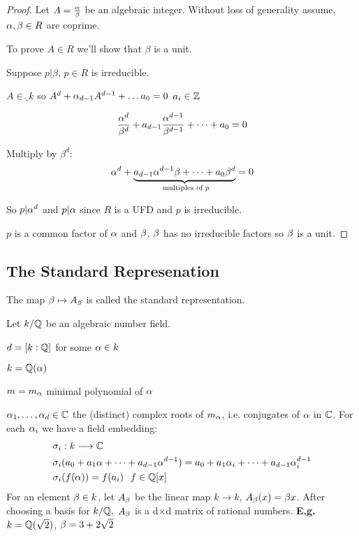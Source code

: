 \documentclass[11pt]{article}
\begin{document}
\begin{proof}
	Let $A = \frac{\alpha}{\beta}$ be an algebraic integer. 
	Without loss of generality assume, $\alpha, \beta \in R$ are coprime.

	To prove $A \in R$ we'll show that $\beta $ is a unit.

	Suppose $p | \beta $, $p \in R$ is irreducible.
 	\spa

	$A \in \ring_k$ so $A^d + \alpha_{d-1}A^{d-1} + \dots a_0 = 0$ \hspace{7pt} $a_i \in \mathbb{Z}$


	\begin{align*}
		\frac{\alpha^d}{\beta^d}  + a_{d-1} \frac{\alpha^{d-1}}{\beta^{d-1}} + \dots + a_0 = 0\\
	\end{align*}

	Multiply by $\beta^d$:
	\begin{align*}
	\alpha^d + \underbrace{a_{d-1}\alpha^{d-1}\beta + \dots + a_0\beta^d}_\text{ multiples of $p$} = 0
	\end{align*}

	So $ p | \alpha^d$ and $p | \alpha$ since $R$ is a UFD and $p$ is irreducible.
	
	$p$ is a common factor of $\alpha $ and $\beta$. \lightning 
	$\beta$ has no irreducible factors so $\beta$ is a unit.

\end{proof}
	\subsection{The Standard Represenation}

	\begin{defn}
The map $\beta \mapsto A_\beta$ is called the standard representation.
	\end{defn}
\spa
	Let $k / \mathbb{Q}$ be an algebraic number field.

	$d = [k: \mathbb{Q}]$ for some $\alpha \in k$
	\spa

	$k = \mathbb{Q} (\alpha)$
	\spa

	$m = m_\alpha$ minimal polynomial of $\alpha$
	\spa

	$\alpha_1, \dots, \alpha_d \in \mathbb{C}$ the (distinct) complex roots of $m_\alpha$, i.e. conjugates of $\alpha$ in $\mathbb{C}$.
	\spac
	For each $\alpha_i$ we have a field embedding:
	\begin{align*}
		\sigma_i&: k \longrightarrow \mathbb{C}\\
		\sigma_i&(a_0 + a_1\alpha + \dots + a_{d-1}\alpha^{d-1} ) = a_0 + a_1\alpha_i + \dots + a_{d-1}\alpha_i^{d-1}\\
		\sigma_i&(f(\alpha)) = f(a_i) \hspace{7pt} f\in \mathbb{Q}[x]
	\end{align*}
\spa
	For an element $\beta \in k$, let $A_\beta$ be the linear map $k \rightarrow k$, $A_\beta(x) = \beta x$.
	After choosing a basis for $k/\mathbb{Q}, $ $A_\beta$ is a d$\times$d matrix of rational numbers.
	\spac
\textbf{E.g.} $k = \mathbb{Q}(\sqrt{2})$, $\beta = 3+2\sqrt{2} $
\end{document}
